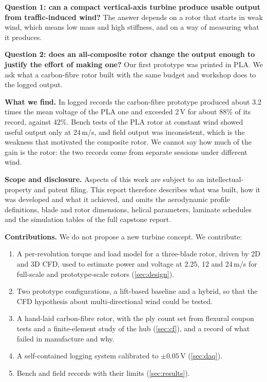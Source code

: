 \documentclass[11pt,letterpaper]{article}
\begin{document}
\textbf{Question 1: can a compact vertical-axis turbine produce usable output from traffic-induced wind?} The answer depends on a rotor that starts in weak wind, which means low mass and high stiffness, and on a way of measuring what it produces.

\textbf{Question 2: does an all-composite rotor change the output enough to justify the effort of making one?} Our first prototype was printed in PLA. We ask what a carbon-fibre rotor built with the same budget and workshop does to the logged output.

\textbf{What we find.} In logged records the carbon-fibre prototype produced about 3.2 times the mean voltage of the PLA one and exceeded 2\,V for about 88\% of its record, against 42\%. Bench tests of the PLA rotor at constant wind showed useful output only at 24\,m/s, and field output was inconsistent, which is the weakness that motivated the composite rotor. We cannot say how much of the gain is the rotor: the two records come from separate sessions under different wind.

\textbf{Scope and disclosure.} Aspects of this work are subject to an intellectual-property and patent filing. This report therefore describes what was built, how it was developed and what it achieved, and omits the aerodynamic profile definitions, blade and rotor dimensions, helical parameters, laminate schedules and the simulation tables of the full capstone report.

\textbf{Contributions.} We do not propose a new turbine concept. We contribute:
\begin{enumerate}
\item A per-revolution torque and load model for a three-blade rotor, driven by 2D and 3D CFD, used to estimate power and voltage at 2.25, 12 and 24\,m/s for full-scale and prototype-scale rotors (\cref{sec:design}).
\item Two prototype configurations, a lift-based baseline and a hybrid, so that the CFD hypothesis about multi-directional wind could be tested.
\item A hand-laid carbon-fibre rotor, with the ply count set from flexural coupon tests and a finite-element study of the hub (\cref{sec:cf}), and a record of what failed in manufacture and why.
\item A self-contained logging system calibrated to $\pm0.05$\,V (\cref{sec:daq}).
\item Bench and field records with their limits (\cref{sec:results}).
\end{enumerate}
\end{document}
